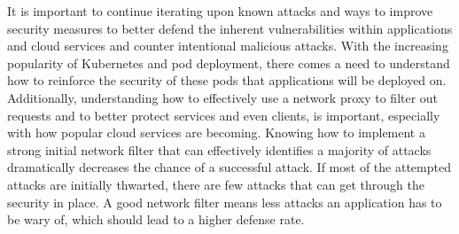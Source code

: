 

It is important to continue iterating upon known attacks and ways to improve security measures to better defend the inherent vulnerabilities within applications and cloud services and
counter intentional malicious attacks. With the increasing popularity of Kubernetes and pod deployment, there comes a need to understand how to reinforce the security of these pods that
applications will be deployed on. Additionally, understanding how to effectively use a network proxy to filter out requests and to better protect services and even clients, is important,
especially with how popular cloud services are becoming. Knowing how to implement a strong initial network filter that can effectively identifies a majority of attacks dramatically decreases
the chance of a successful attack. If most of the attempted attacks are initially thwarted, there are few attacks that can get through the security in place. A good network filter means less
attacks an application has to be wary of, which should lead to a higher defense rate.